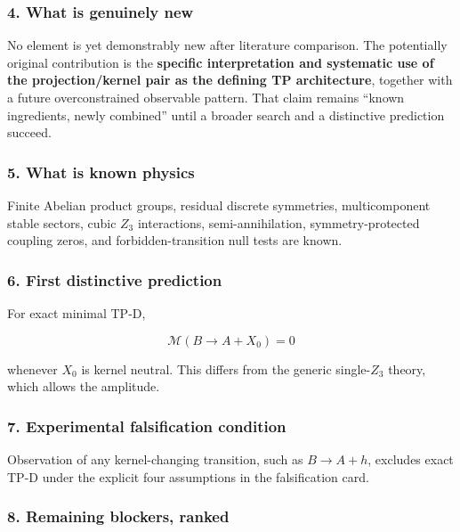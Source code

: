 \documentclass[
]{article}
\begin{document}
\hypertarget{what-is-genuinely-new}{%
\subsubsection{4. What is genuinely new}\label{what-is-genuinely-new}}

No element is yet demonstrably new after literature comparison. The
potentially original contribution is the \textbf{specific interpretation
and systematic use of the projection/kernel pair as the defining TP
architecture}, together with a future overconstrained observable
pattern. That claim remains ``known ingredients, newly combined'' until
a broader search and a distinctive prediction succeed.

\hypertarget{what-is-known-physics}{%
\subsubsection{5. What is known physics}\label{what-is-known-physics}}

Finite Abelian product groups, residual discrete symmetries,
multicomponent stable sectors, cubic \(Z_3\) interactions,
semi-annihilation, symmetry-protected coupling zeros, and
forbidden-transition null tests are known.

\hypertarget{first-distinctive-prediction}{%
\subsubsection{6. First distinctive
prediction}\label{first-distinctive-prediction}}

For exact minimal TP-D,

\[
\boxed{\mathcal M(B\to A+X_0)=0}
\]

whenever \(X_0\) is kernel neutral. This differs from the generic
single-\(Z_3\) theory, which allows the amplitude.

\hypertarget{experimental-falsification-condition}{%
\subsubsection{7. Experimental falsification
condition}\label{experimental-falsification-condition}}

Observation of any kernel-changing transition, such as \(B\to A+h\),
excludes exact TP-D under the explicit four assumptions in the
falsification card.

\hypertarget{remaining-blockers-ranked}{%
\subsubsection{8. Remaining blockers,
ranked}\label{remaining-blockers-ranked}}
\end{document}
